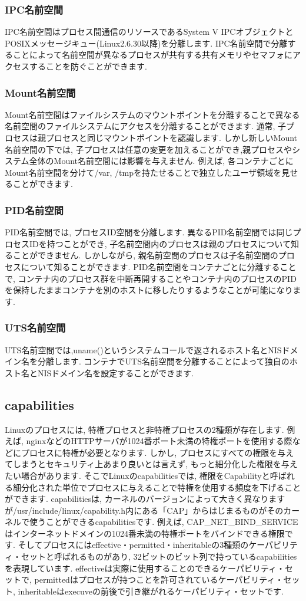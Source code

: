 \subsubsection{IPC名前空間}
IPC名前空間はプロセス間通信のリソースであるSystem V IPCオブジェクトとPOSIXメッセージキュー(Linux2.6.30以降)を分離します. IPC名前空間で分離することによって名前空間が異なるプロセスが共有する共有メモリやセマフォにアクセスすることを防ぐことができます.
\subsubsection{Mount名前空間}
Mount名前空間はファイルシステムのマウントポイントを分離することで異なる名前空間のファイルシステムにアクセスを分離することができます. 通常, 子プロセスは親プロセスと同じマウントポイントを認識します. しかし新しいMount名前空間の下では, 子プロセスは任意の変更を加えることができ,親プロセスやシステム全体のMount名前空間には影響を与えません. 例えば, 各コンテナごとにMount名前空間を分けて/var, /tmpを持たせることで独立したユーザ領域を見せることができます.
\subsubsection{PID名前空間}
PID名前空間では, プロセスID空間を分離します. 異なるPID名前空間では同じプロセスIDを持つことができ, 子名前空間内のプロセスは親のプロセスについて知ることができません. しかしながら, 親名前空間のプロセスは子名前空間のプロセスについて知ることができます. PID名前空間をコンテナごとに分離することで, コンテナ内のプロセス群を中断再開することやコンテナ内のプロセスのPIDを保持したままコンテナを別のホストに移したりするようなことが可能になります.
\subsubsection{UTS名前空間}
UTS名前空間では,uname()というシステムコールで返されるホスト名とNISドメイン名を分離します. コンテナでUTS名前空間を分離することによって独自のホスト名とNISドメイン名を設定することができます.
\subsection{capabilities}
Linuxのプロセスには, 特権プロセスと非特権プロセスの2種類が存在します. 例えば, nginxなどのHTTPサーバが1024番ポート未満の特権ポートを使用する際などにプロセスに特権が必要となります. しかし, プロセスにすべての権限を与えてしまうとセキュリティ上あまり良いとは言えず, もっと細分化した権限を与えたい場合があります. そこでLinuxのcapabilitiesでは, 権限をCapabilityと呼ばれる細分化された単位でプロセスに与えることで特権を使用する頻度を下げることができます. capabilitiesは, カーネルのバージョンによって大きく異なりますが/usr/include/linux/capability.h内にある「CAP」からはじまるものがそのカーネルで使うことができるcapabilitiesです. 例えば, CAP\_NET\_BIND\_SERVICEはインターネットドメインの1024番未満の特権ポートをバインドできる権限です. そしてプロセスにはeffective・permitted・inheritableの3種類のケーパビリティ・セットと呼ばれるものがあり, 32ビットのビット列で持っているcapabilitiesを表現しています. effectiveは実際に使用することのできるケーパビリティ・セットで, permittedはプロセスが持つことを許可されているケーパビリティ・セット, inheritableはexecuveの前後で引き継がれるケーパビリティ・セットです.

